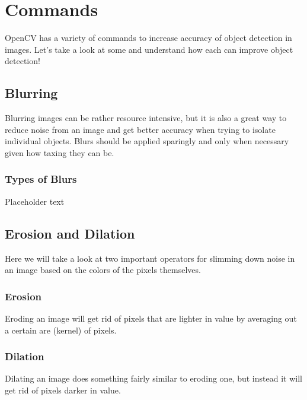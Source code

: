 \documentclass[12pt]{article}
\begin{document}
\section{Commands}
OpenCV has a variety of commands to increase accuracy of object detection in images. Let's take a look at some and understand how each can improve object detection!
\subsection*{Blurring}
Blurring images can be rather resource intensive, but it is also a great way to reduce noise from an image and get better accuracy when trying to isolate individual objects. Blurs should be applied sparingly and only when necessary given how taxing they can be.
\subsubsection*{Types of Blurs}
Placeholder text
\subsection*{Erosion and Dilation}
Here we will take a look at two important operators for slimming down noise in an image based on the colors of the pixels themselves.
\subsubsection*{Erosion}
Eroding an image will get rid of pixels that are lighter in value by averaging out a certain are (kernel) of pixels.
\subsubsection*{Dilation}
Dilating an image does something fairly similar to eroding one, but instead it will get rid of pixels darker in value.

\end{document}
